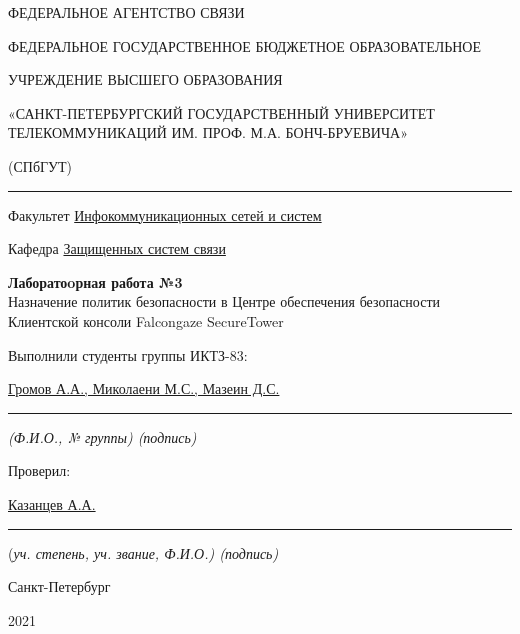 \documentclass[a4paper,14pt]{extarticle}
\begin{document}
    \begin{center}
        \thispagestyle{empty}
        \begin{singlespace}
        ФЕДЕРАЛЬНОЕ АГЕНТСТВО СВЯЗИ

        ФЕДЕРАЛЬНОЕ ГОСУДАРСТВЕННОЕ БЮДЖЕТНОЕ ОБРАЗОВАТЕЛЬНОЕ

        УЧРЕЖДЕНИЕ ВЫСШЕГО ОБРАЗОВАНИЯ

        «САНКТ-ПЕТЕРБУРГСКИЙ ГОСУДАРСТВЕННЫЙ УНИВЕРСИТЕТ ТЕЛЕКОММУНИКАЦИЙ ИМ. ПРОФ. М.А. БОНЧ-БРУЕВИЧА»

        (СПбГУТ)
        \end{singlespace}
        \vspace{-1ex}
        \rule{\textwidth}{0.4pt}
        \vspace{-5ex}

        Факультет \underline{Инфокоммуникационных сетей и систем}

        Кафедра \underline{Защищенных систем связи}
        \vspace{10ex}

        \textbf{Лаборатоoрная работа №3}\\
        Назначение политик безопасности в Центре обеспечения
        безопасности Клиентской консоли Falcongaze SecureTower
        

    \end{center}
    \vspace{4ex}
    \begin{flushright}
    \parbox{10 cm}{
    \begin{flushleft}
        Выполнили студенты группы ИКТЗ-83:

        \underline{Громов А.А., Миколаени М.С., Мазеин Д.С.} \hfill \rule[-0.85ex]{0.1\textwidth}{0.6pt}

        \footnotesize \textit{ (Ф.И.О., № группы) \hfill (подпись)} \normalsize

        Проверил:

        \underline{Казанцев А.А.} \hfill \rule[-0.85ex]{0.1\textwidth}{0.6pt}

        (\footnotesize \textit{уч. степень, уч. звание, Ф.И.О.) \hfill (подпись)} \normalsize

    \end{flushleft}
    }
    \end{flushright}
    \begin{center}
        \vfill
        Санкт-Петербург

        2021

    \end{center}
    \newpage
\end{document}
